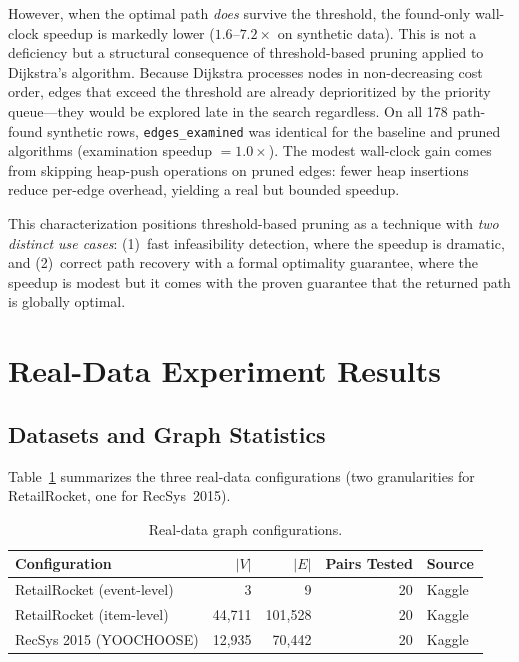 However, when the optimal path \emph{does} survive the threshold, the found-only wall-clock speedup is markedly lower ($1.6$--$7.2\times$ on synthetic data). This is not a deficiency but a structural consequence of threshold-based pruning applied to Dijkstra's algorithm. Because Dijkstra processes nodes in non-decreasing cost order, edges that exceed the threshold are already deprioritized by the priority queue---they would be explored late in the search regardless. On all 178 path-found synthetic rows, \texttt{edges\_examined} was identical for the baseline and pruned algorithms (examination speedup $= 1.0\times$). The modest wall-clock gain comes from skipping heap-push operations on pruned edges: fewer heap insertions reduce per-edge overhead, yielding a real but bounded speedup.

This characterization positions threshold-based pruning as a technique with \emph{two distinct use cases}: (1)~fast infeasibility detection, where the speedup is dramatic, and (2)~correct path recovery with a formal optimality guarantee, where the speedup is modest but it comes with the proven guarantee that the returned path is globally optimal.

\section{Real-Data Experiment Results}\label{sec:real_results}

\subsection{Datasets and Graph Statistics}

Table~\ref{table:real_data_graphs} summarizes the three real-data configurations (two granularities for RetailRocket, one for RecSys~2015).

\begin{table}[htbp]
\centering
\small
\renewcommand{\arraystretch}{1.3}
\begin{tabular}{@{}lrrrl@{}}
\toprule
Configuration & $|V|$ & $|E|$ & Pairs Tested & Source \\
\midrule
RetailRocket (event-level)  &          3 &          9 & 20 & Kaggle~\citep{retailrocket2015} \\
RetailRocket (item-level)   &     44,711 &    101,528 & 20 & Kaggle~\citep{retailrocket2015} \\
RecSys 2015 (YOOCHOOSE)     &     12,935 &     70,442 & 20 & Kaggle~\citep{recsys2015}       \\
\bottomrule
\end{tabular}
\caption[Real-data graph configurations]{Real-data graph configurations.}
\label{table:real_data_graphs}
\end{table}


